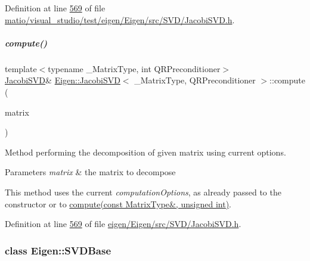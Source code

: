 Definition at line \hyperlink{matio_2visual__studio_2test_2eigen_2_eigen_2src_2_s_v_d_2_jacobi_s_v_d_8h_source_l00569}{569} of file \hyperlink{matio_2visual__studio_2test_2eigen_2_eigen_2src_2_s_v_d_2_jacobi_s_v_d_8h_source}{matio/visual\+\_\+studio/test/eigen/\+Eigen/src/\+S\+V\+D/\+Jacobi\+S\+V\+D.\+h}.

\mbox{\label{group___s_v_d___module_acc7b9a4068cf7b69ae3227d217ed7efd}} 
\subparagraph{\texorpdfstring{compute()}{compute()}\hspace{0.1cm}{\footnotesize\ttfamily [4/4]}}
{\footnotesize\ttfamily template$<$typename \+\_\+\+Matrix\+Type, int Q\+R\+Preconditioner$>$ \\
\hyperlink{group___s_v_d___module_class_eigen_1_1_jacobi_s_v_d}{Jacobi\+S\+VD}\& \hyperlink{group___s_v_d___module_class_eigen_1_1_jacobi_s_v_d}{Eigen\+::\+Jacobi\+S\+VD}$<$ \+\_\+\+Matrix\+Type, Q\+R\+Preconditioner $>$\+::compute (\begin{DoxyParamCaption}\item[{const Matrix\+Type \&}]{matrix }\end{DoxyParamCaption})\hspace{0.3cm}{\ttfamily [inline]}}



Method performing the decomposition of given matrix using current options. 


\begin{DoxyParams}{Parameters}
{\em matrix} & the matrix to decompose\\
\hline
\end{DoxyParams}
This method uses the current {\itshape computation\+Options}, as already passed to the constructor or to \hyperlink{group___s_v_d___module_a5dab376cc86cf0d36674bcdad4af3f5a}{compute(const Matrix\+Type\&, unsigned int)}. 

Definition at line \hyperlink{eigen_2_eigen_2src_2_s_v_d_2_jacobi_s_v_d_8h_source_l00569}{569} of file \hyperlink{eigen_2_eigen_2src_2_s_v_d_2_jacobi_s_v_d_8h_source}{eigen/\+Eigen/src/\+S\+V\+D/\+Jacobi\+S\+V\+D.\+h}.

\label{class_eigen_1_1_s_v_d_base}
\subsubsection{class Eigen\+:\+:S\+V\+D\+Base}
